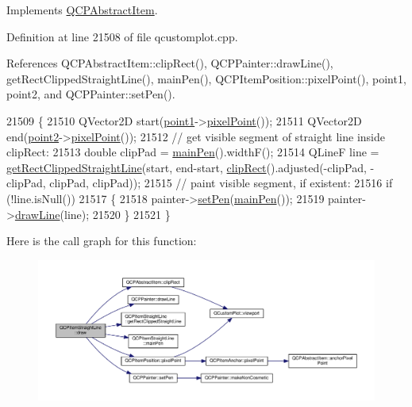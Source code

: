 Implements \hyperlink{class_q_c_p_abstract_item_ad0dc056f650c3ca73414e6b4f01674ef}{Q\+C\+P\+Abstract\+Item}.



Definition at line 21508 of file qcustomplot.\+cpp.



References Q\+C\+P\+Abstract\+Item\+::clip\+Rect(), Q\+C\+P\+Painter\+::draw\+Line(), get\+Rect\+Clipped\+Straight\+Line(), main\+Pen(), Q\+C\+P\+Item\+Position\+::pixel\+Point(), point1, point2, and Q\+C\+P\+Painter\+::set\+Pen().


\begin{DoxyCode}
21509 \{
21510   QVector2D start(\hyperlink{class_q_c_p_item_straight_line_ac131a6ffe456f2cc7364dce541fe0120}{point1}->\hyperlink{class_q_c_p_item_position_ae490f9c76ee2ba33752c495d3b6e8fb5}{pixelPoint}());
21511   QVector2D end(\hyperlink{class_q_c_p_item_straight_line_ad26c0a732e471f63f75d481dcd48cfc9}{point2}->\hyperlink{class_q_c_p_item_position_ae490f9c76ee2ba33752c495d3b6e8fb5}{pixelPoint}());
21512   \textcolor{comment}{// get visible segment of straight line inside clipRect:}
21513   \textcolor{keywordtype}{double} clipPad = \hyperlink{class_q_c_p_item_straight_line_a63ef39814c5b560dbb7b13e3fec1d940}{mainPen}().widthF();
21514   QLineF line = \hyperlink{class_q_c_p_item_straight_line_af18ac29577b5b96fece15b0ffea70177}{getRectClippedStraightLine}(start, end-start, 
      \hyperlink{class_q_c_p_abstract_item_a538e25ff8856534582f5b2b400a46405}{clipRect}().adjusted(-clipPad, -clipPad, clipPad, clipPad));
21515   \textcolor{comment}{// paint visible segment, if existent:}
21516   \textcolor{keywordflow}{if} (!line.isNull())
21517   \{
21518     painter->\hyperlink{class_q_c_p_painter_af9c7a4cd1791403901f8c5b82a150195}{setPen}(\hyperlink{class_q_c_p_item_straight_line_a63ef39814c5b560dbb7b13e3fec1d940}{mainPen}());
21519     painter->\hyperlink{class_q_c_p_painter_a0b4b1b9bd495e182c731774dc800e6e0}{drawLine}(line);
21520   \}
21521 \}
\end{DoxyCode}


Here is the call graph for this function\+:\nopagebreak
\begin{figure}[H]
\begin{center}
\leavevmode
\includegraphics[width=350pt]{class_q_c_p_item_straight_line_a2daa1e1253216c26565d56a2d5530170_cgraph}
\end{center}
\end{figure}


